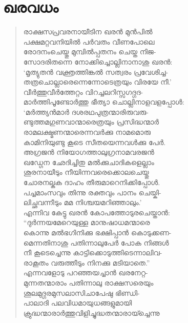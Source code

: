 \section{ഖരവധം}

\begin{verse}
രാക്ഷസപ്രവരനായീടിന ഖരന്‍ മുന്‍പില്‍\\
പക്ഷമറ്റവനിയില്‍ പര്‍വതം വീണപോലെ\\
രോദനംചെയ്തു മുമ്പില്‍പ്പതനം ചെയ്ത നിജ-\\
സോദരിതന്നെ നോക്കിച്ചൊല്ലിനാനാശു ഖരന്‍:\\
‘മൃത്യുതന്‍ വക്ത്രത്തിങ്കല്‍ സത്വരം പ്രവേശിച്ച-\\
തത്രചൊല്ലാരെന്നെന്നോടെത്രയും വിരയേ നീ.’\\
വീര്‍ത്തുവീര്‍ത്തേറ്റം വിറച്ചലറിസ്സഗദ്ഗദ-\\
മാര്‍ത്തിപൂണ്ടോര്‍ത്തു ഭീത്യാ ചൊല്ലിനാളവളപ്പോള്‍:\\
‘മര്‍ത്ത്യന്‍മാര്‍ ദശരഥപുത്രന്മാരിരുവരു-\\
ണ്ടുത്തമഗുണവാന്മാരെത്രയും പ്രസിദ്ധന്മാര്‍\\
രാമലക്ഷ്മണന്മാരെന്നവര്‍ക്കു നാമമൊരു\\
കാമിനിയുണ്ടു കൂടെ സീതയെന്നവള്‍ക്കു പേര്‍.\\
അഗ്രജന്‍ നിയോഗത്താലുഗ്രനാമവരജന്‍\\
ഖഡ്ഗേന ഛേദിച്ചിതു മല്‍ക്കുചാദികളെല്ലാം\\
ശൂരനായീടും നീയിന്നവരെക്കൊലചെയ്തു\\
ചോരനല്കുക ദാഹം തീരുമാറെനിക്കിപ്പോള്‍.\\
പച്ചമാംസവും തിന്നു രക്തവും പാനം ചെയ്കി-\\
ലിച്ഛവന്നീടും മമ നിശ്ചയമറിഞ്ഞാലും.’\\
എന്നിവ കേട്ടു ഖരന്‍ കോപത്തോടുരചെയ്താന്‍:\\
“ദുര്‍ന്നയമേറെയുള്ള മാനുഷാധമന്മാരെ\\
കൊന്നു മല്‍ഭഗിനിക്കു ഭക്ഷിപ്പാന്‍ കൊടുക്കണ-\\
മെന്നതിനാശു പതിന്നാലുപേര്‍ പോക നിങ്ങള്‍\\
നീ കൂടെച്ചെന്നു കാട്ടിക്കൊടുത്തിടെന്നാലിവ-\\
രാകൂതം വരുത്തീടും നിനക്കു മടിയാതെ.”\\
എന്നവളോടു പറഞ്ഞയച്ചാന്‍ ഖരനേറ്റ-\\
മുന്നതന്മാരാം പതിന്നാലു രാക്ഷസരെയും\\
ശൂലമുദ്ഗരമുസലാസിചാപേഷു ഭിണ്ഡി-\\
പാലാദി പലവിധമായുധങ്ങളുമായി\\
ക്രുദ്ധന്മാരാര്‍ത്തുവിളിച്ചുദ്ധതന്മാരായ്ച്ചെന്നു\\

\end{verse}
